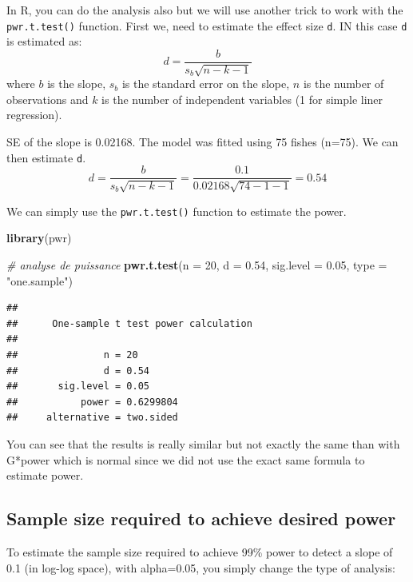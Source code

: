 \documentclass[
  12pt,
]{book}
\newenvironment{Shaded}{\begin{snugshade}}{\end{snugshade}}
\newcommand{\CommentTok}[1]{\textcolor[rgb]{0.56,0.35,0.01}{\textit{#1}}}
\newcommand{\DataTypeTok}[1]{\textcolor[rgb]{0.13,0.29,0.53}{#1}}
\newcommand{\DecValTok}[1]{\textcolor[rgb]{0.00,0.00,0.81}{#1}}
\newcommand{\FloatTok}[1]{\textcolor[rgb]{0.00,0.00,0.81}{#1}}
\newcommand{\KeywordTok}[1]{\textcolor[rgb]{0.13,0.29,0.53}{\textbf{#1}}}
\newcommand{\NormalTok}[1]{#1}
\newcommand{\StringTok}[1]{\textcolor[rgb]{0.31,0.60,0.02}{#1}}
\begin{document}
In R, you can do the analysis also but we will use another trick to work with the \texttt{pwr.t.test()} function.
First we, need to estimate the effect size \texttt{d}. IN this case \texttt{d} is estimated as:
\[ d = \frac{b}{s_b\sqrt{n-k-1}} \]
where \(b\) is the slope, \(s_b\) is the standard error on the slope, \(n\) is the number of observations and \(k\) is the number of independent variables (1 for simple liner regression).

SE of the slope is 0.02168. The model was fitted using 75 fishes (n=75). We can then estimate \texttt{d}.
\[ d = \frac{b}{s_b\sqrt{n-k-1}} = \frac{0.1}{0.02168\sqrt{74-1-1}}=0.54\]

We can simply use the \texttt{pwr.t.test()} function to estimate the power.

\begin{Shaded}
\begin{Highlighting}[]
\KeywordTok{library}\NormalTok{(pwr)}

\CommentTok{\# analyse de puissance}
\KeywordTok{pwr.t.test}\NormalTok{(}\DataTypeTok{n =} \DecValTok{20}\NormalTok{, }\DataTypeTok{d =} \FloatTok{0.54}\NormalTok{, }\DataTypeTok{sig.level =} \FloatTok{0.05}\NormalTok{, }\DataTypeTok{type =} \StringTok{"one.sample"}\NormalTok{)}
\end{Highlighting}
\end{Shaded}

\begin{verbatim}
## 
##      One-sample t test power calculation 
## 
##               n = 20
##               d = 0.54
##       sig.level = 0.05
##           power = 0.6299804
##     alternative = two.sided
\end{verbatim}

You can see that the results is really similar but not exactly the same than with G*power which is normal since we did not use the exact same formula to estimate power.

\hypertarget{sample-size-required-to-achieve-desired-power}{%
\subsection{Sample size required to achieve desired power}\label{sample-size-required-to-achieve-desired-power}}

To estimate the sample size required to achieve 99\% power to detect a slope of 0.1 (in log-log space), with alpha=0.05, you simply change the type of analysis:
\end{document}
